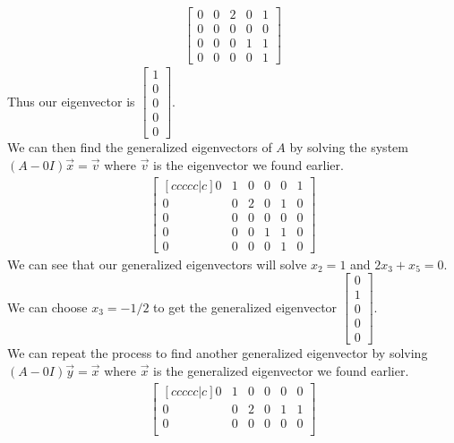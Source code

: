 \documentclass[answers,12pt,addpoints]{exam}
\begin{document}
\begin{questions}
\begin{solution}
\begin{align*}
\begin{bmatrix}
                0 & 0 & 2 & 0 & 1 \\
                0 & 0 & 0 & 0 & 0 \\
                0 & 0 & 0 & 1 & 1 \\
                0 & 0 & 0 & 0 & 1
            \end{bmatrix}
        \end{align*}
        Thus our eigenvector is $\begin{bmatrix} 1\\ 0\\ 0\\ 0\\ 0 \end{bmatrix}$. \\
        We can then find the generalized eigenvectors of $A$ by solving the system $(A - 0I)\vec{x} = \vec{v}$ where $\vec{v}$ is the eigenvector we found earlier.
        \begin{align*}
            \begin{bmatrix}[ccccc|c]
                0 & 1 & 0 & 0 & 0 & 1 \\
                0 & 0 & 2 & 0 & 1 & 0 \\
                0 & 0 & 0 & 0 & 0 & 0 \\
                0 & 0 & 0 & 1 & 1 & 0 \\
                0 & 0 & 0 & 0 & 1 & 0
            \end{bmatrix}
        \end{align*}
        We can see that our generalized eigenvectors will solve $x_2 = 1$ and $2x_3 + x_5 = 0$. We can choose $x_3 = -1/2$ to get the generalized eigenvector $\begin{bmatrix} 0 \\ 1\\ 0 \\0 \\0\end{bmatrix}$. \\
        We can repeat the process to find another generalized eigenvector by solving $(A - 0I)\vec{y} = \vec{x}$ where $\vec{x}$ is the generalized eigenvector we found earlier.
        \begin{align*}
            \begin{bmatrix}[ccccc|c]
                0 & 1 & 0 & 0 & 0 & 0 \\
                0 & 0 & 2 & 0 & 1 & 1 \\
                0 & 0 & 0 & 0 & 0 & 0 \\

\end{bmatrix}
\end{align*}
\end{solution}
\end{questions}
\end{document}

